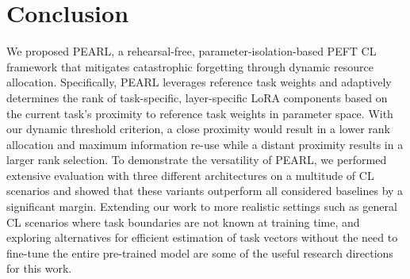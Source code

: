 \documentclass[10pt]{article} %
\begin{document}
\begin{table}[h]
    \centering
    \caption{Comparison of parameter growth (in Millions) in PEARL with respect to complete parameter isolation in different number of tasks. }
    \label{tab:growth}
\end{table}




\section{Conclusion}
We proposed PEARL, a rehearsal-free, parameter-isolation-based PEFT CL framework that mitigates catastrophic forgetting through dynamic resource allocation. Specifically, PEARL leverages reference task weights and adaptively determines the rank of task-specific, layer-specific LoRA components based on the current task’s proximity to reference task weights in parameter space. With our dynamic threshold criterion, a close proximity would result in a lower rank allocation and maximum information re-use while a distant proximity results in a larger rank selection. To demonstrate the versatility of PEARL, we performed extensive evaluation with three different architectures on a multitude of CL scenarios and showed that these variants outperform all considered baselines by a significant margin. Extending our work to more realistic settings such as general CL scenarios where task boundaries are not known at training time, and exploring alternatives for efficient estimation of task vectors without the need to fine-tune the entire pre-trained model are some of the useful research directions for this work.
\end{document}
